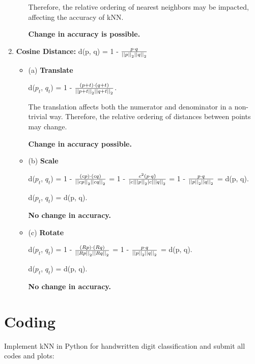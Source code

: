 \documentclass[fleqn]{article}
\begin{document}
\begin{enumerate}
\begin{itemize}
		            Therefore, the relative ordering of nearest neighbors may be impacted, affecting the accuracy of kNN.

		            \textbf{Change in accuracy is possible.}
	      \end{itemize}

	\item \textbf{Cosine Distance:} d(p, q) = 1 - $\frac{p \cdot q}{\left\vert\left\vert p \right\vert\right\vert_2 \left\vert\left\vert q \right\vert\right\vert_2}$
	      \begin{itemize}
		      \item (a) \textbf{Translate}

		            d($p_t$, $q_t$) = 1 - $\frac{(p + t) \cdot (q + t)}{\left\vert\left\vert p + t \right\vert\right\vert_2 \left\vert\left\vert q + t \right\vert\right\vert_2}$.

		            The translation affects both the numerator and denominator in a non-trivial way.
		            Therefore, the relative ordering of distances between points may change.

		            \textbf{Change in accuracy possible.}

		      \item (b) \textbf{Scale}

		            d($p_t$, $q_t$) = 1 - $\frac{(c p) \cdot (c q)}{\left\vert\left\vert c p \right\vert\right\vert_2 \left\vert\left\vert c q \right\vert\right\vert_2}$ = 1 - $\frac{c^2 (p \cdot q)}{|c| \left\vert\left\vert p \right\vert\right\vert_2 |c| \left\vert\left\vert q \right\vert\right\vert_2}$ = 1 - $\frac{p \cdot q}{\left\vert\left\vert p \right\vert\right\vert_2 \left\vert\left\vert q \right\vert\right\vert_2}$ = d(p, q).

		            d($p_t$, $q_t$) = d(p, q).

		            \textbf{No change in accuracy.}

		      \item (c) \textbf{Rotate}

		            d($p_t$, $q_t$) = 1 - $\frac{(R p) \cdot (R q)}{\left\vert\left\vert R p \right\vert\right\vert_2 \left\vert\left\vert R q \right\vert\right\vert_2}$ = 1 - $\frac{p \cdot q}{\left\vert\left\vert p \right\vert\right\vert_2 \left\vert\left\vert q \right\vert\right\vert_2}$ = d(p, q).

		            d($p_t$, $q_t$) = d(p, q).

		            \textbf{No change in accuracy.}
	      \end{itemize}
\end{enumerate}

\section{Coding}

Implement kNN in Python for handwritten digit classification and submit all codes and plots:
\end{document}
